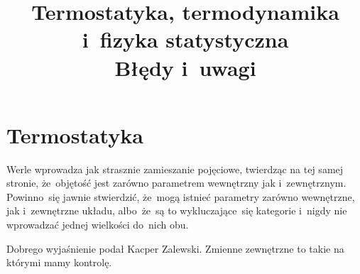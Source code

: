 \documentclass[a4paper,11pt]{article}
\title{Termostatyka, termodynamika i~fizyka statystyczna \\
  Błędy i~uwagi}
\begin{document}





\maketitle %




\section{Termostatyka}

\vspace{\spaceTwo}









\start {} Werle wprowadza jak strasznie zamieszanie pojęciowe,
twierdząc na tej samej stronie, że~objętość jest zarówno parametrem
wewnętrzny jak i~zewnętrznym. Powinno~się jawnie stwierdzić, że~mogą
istnieć parametry zarówno wewnętrzne, jak i~zewnętrzne układu,
albo~że~są to wykluczające~się kategorie i~nigdy nie wprowadzać
jednej wielkości do~nich obu.

Dobrego wyjaśnienie podał Kacper Zalewski. Zmienne zewnętrzne to takie na którymi mamy kontrolę. 

\vspace{\spaceFour}



\start {}





\end{document}
